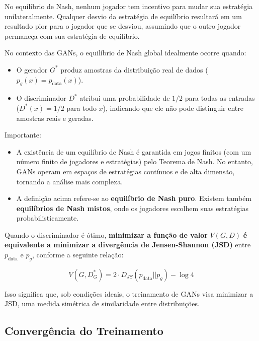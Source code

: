 \documentclass{tufte-handout}
\let\subsubsection\subsection
\begin{document}
\begin{thm}
No equilíbrio de Nash, nenhum jogador tem incentivo para mudar sua estratégia unilateralmente. Qualquer desvio da estratégia de equilíbrio resultará em um resultado pior para o jogador que se desviou, assumindo que o outro jogador permaneça com sua estratégia de equilíbrio.

No contexto das GANs, o equilíbrio de Nash global idealmente ocorre quando:

\begin{itemize}
    \item O gerador $G^*$ produz amostras da distribuição real de dados ($p_g(x) = p_{\text{data}}(x)$).
    \item O discriminador $D^*$ atribui uma probabilidade de $1/2$ para todas as entradas ($D^*(x) = 1/2$ para todo $x$), indicando que ele não pode distinguir entre amostras reais e geradas.
\end{itemize} 

Importante:
\begin{itemize}
    \item A existência de um equilíbrio de Nash é garantida em jogos finitos (com um número finito de jogadores e estratégias) pelo Teorema de Nash. No entanto, GANs operam em espaços de estratégias contínuos e de alta dimensão, tornando a análise mais complexa.
    \item A definição acima refere-se ao \textbf{equilíbrio de Nash puro}. Existem também \textbf{equilíbrios de Nash mistos}, onde os jogadores escolhem suas estratégias probabilisticamente.
\end{itemize}
\end{thm}

\begin{thm}

Quando o discriminador é ótimo, \textbf{minimizar a função de valor} $V(G, D)$ \textbf{é equivalente a minimizar a divergência de Jensen-Shannon (JSD)} entre $p_{\text{data}}$ e $p_g$, conforme a seguinte relação:

\begin{equation}
V(G, D^*_G) = 2 \cdot D_{JS}(p_{\text{data}} || p_g) - \log 4
\end{equation}

Isso significa que, sob condições ideais, o treinamento de GANs visa minimizar a JSD, uma medida simétrica de similaridade entre distribuições.
\end{thm}

\subsubsection{Convergência do Treinamento}
\end{document}

